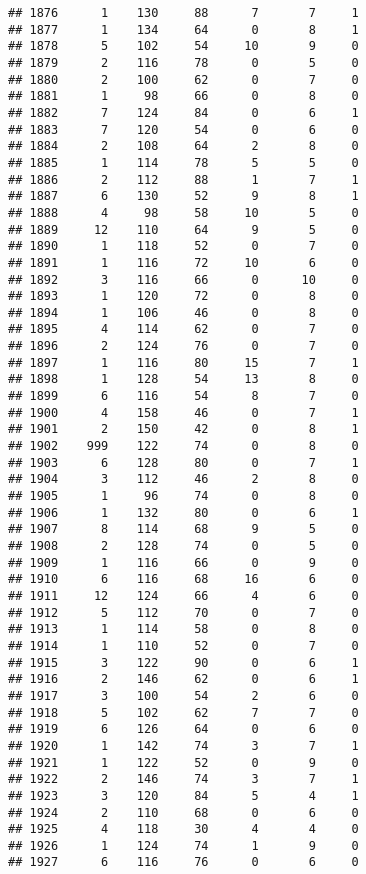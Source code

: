 \documentclass[
]{article}
\begin{document}
\begin{verbatim}
## 1876      1    130     88      7       7     1
## 1877      1    134     64      0       8     1
## 1878      5    102     54     10       9     0
## 1879      2    116     78      0       5     0
## 1880      2    100     62      0       7     0
## 1881      1     98     66      0       8     0
## 1882      7    124     84      0       6     1
## 1883      7    120     54      0       6     0
## 1884      2    108     64      2       8     0
## 1885      1    114     78      5       5     0
## 1886      2    112     88      1       7     1
## 1887      6    130     52      9       8     1
## 1888      4     98     58     10       5     0
## 1889     12    110     64      9       5     0
## 1890      1    118     52      0       7     0
## 1891      1    116     72     10       6     0
## 1892      3    116     66      0      10     0
## 1893      1    120     72      0       8     0
## 1894      1    106     46      0       8     0
## 1895      4    114     62      0       7     0
## 1896      2    124     76      0       7     0
## 1897      1    116     80     15       7     1
## 1898      1    128     54     13       8     0
## 1899      6    116     54      8       7     0
## 1900      4    158     46      0       7     1
## 1901      2    150     42      0       8     1
## 1902    999    122     74      0       8     0
## 1903      6    128     80      0       7     1
## 1904      3    112     46      2       8     0
## 1905      1     96     74      0       8     0
## 1906      1    132     80      0       6     1
## 1907      8    114     68      9       5     0
## 1908      2    128     74      0       5     0
## 1909      1    116     66      0       9     0
## 1910      6    116     68     16       6     0
## 1911     12    124     66      4       6     0
## 1912      5    112     70      0       7     0
## 1913      1    114     58      0       8     0
## 1914      1    110     52      0       7     0
## 1915      3    122     90      0       6     1
## 1916      2    146     62      0       6     1
## 1917      3    100     54      2       6     0
## 1918      5    102     62      7       7     0
## 1919      6    126     64      0       6     0
## 1920      1    142     74      3       7     1
## 1921      1    122     52      0       9     0
## 1922      2    146     74      3       7     1
## 1923      3    120     84      5       4     1
## 1924      2    110     68      0       6     0
## 1925      4    118     30      4       4     0
## 1926      1    124     74      1       9     0
## 1927      6    116     76      0       6     0

\end{verbatim}
\end{document}
